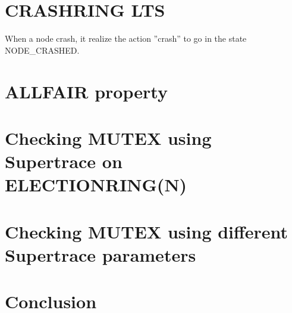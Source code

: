 \documentclass[fleqn]{article}
\begin{document}


\newpage
\section{CRASHRING LTS}



When a node crash, it realize the action ''crash'' to go in the state NODE\_CRASHED.

\section{ALLFAIR property}





\section{Checking MUTEX using Supertrace on ELECTIONRING(N)}


\section{Checking MUTEX using different Supertrace parameters}


\section{Conclusion}

\end{document}
